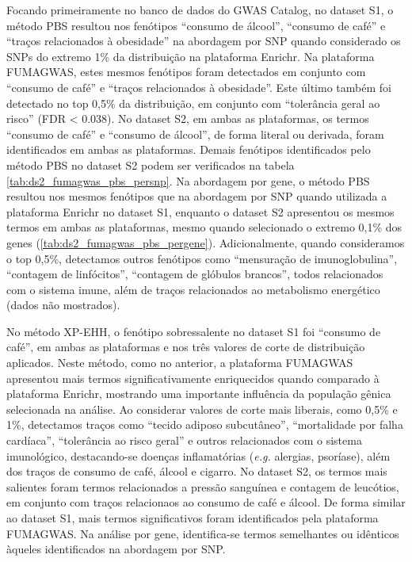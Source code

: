 Focando primeiramente no banco de dados do GWAS Catalog, no dataset S1, o método PBS resultou nos fenótipos “consumo de álcool”, “consumo de café” e “traços relacionados à obesidade” na abordagem por SNP quando considerado os SNPs do extremo 1\% da distribuição na plataforma Enrichr. Na plataforma FUMAGWAS, estes mesmos fenótipos foram detectados em conjunto com “consumo de café” e “traços relacionados à obesidade”. Este último também foi detectado no top 0,5\% da distribuição, em conjunto com “tolerância geral ao risco” (FDR < 0.038). No dataset S2, em ambas as plataformas, os termos “consumo de café” e “consumo de álcool”, de forma literal ou derivada, foram identificados em ambas as plataformas. Demais fenótipos identificados pelo método PBS no dataset S2 podem ser verificados na tabela \ref{tab:ds2_fumagwas_pbs_persnp}. Na abordagem por gene, o método PBS resultou nos mesmos fenótipos que na abordagem por SNP quando utilizada a plataforma Enrichr no dataset S1, enquanto o dataset S2 apresentou os mesmos termos em ambas as plataformas, mesmo quando selecionado o extremo 0,1\% dos genes (\autoref{tab:ds2_fumagwas_pbs_pergene}). Adicionalmente, quando consideramos o top 0,5\%, detectamos outros fenótipos como “mensuração de imunoglobulina”, “contagem de linfócitos”, “contagem de glóbulos brancos”, todos relacionados com o sistema imune, além de traços relacionados ao metabolismo energético (dados não mostrados).  



No método XP-EHH, o fenótipo sobressalente no dataset S1 foi “consumo de café”, em ambas as plataformas e nos três valores de corte de distribuição aplicados. Neste método, como no anterior, a plataforma FUMAGWAS apresentou mais termos significativamente enriquecidos quando comparado à plataforma Enrichr, mostrando uma importante influência da população gênica selecionada na análise. Ao considerar valores de corte mais liberais, como 0,5\% e 1\%, detectamos traços como “tecido adiposo subcutâneo”, “mortalidade por falha cardíaca”, “tolerância ao risco geral” e outros relacionados com o sistema imunológico, destacando-se doenças inflamatórias (\emph{e.g.} alergias, psoríase), além dos traços de consumo de café, álcool e cigarro. No dataset S2, os termos mais salientes foram termos relacionados a pressão sanguínea e contagem de leucótios, em conjunto com traços relacionaos ao consumo de café e álcool. De forma similar ao dataset S1, mais termos significativos foram identificados pela plataforma FUMAGWAS. Na análise por gene, identifica-se termos semelhantes ou idênticos àqueles identificados na abordagem por SNP.

